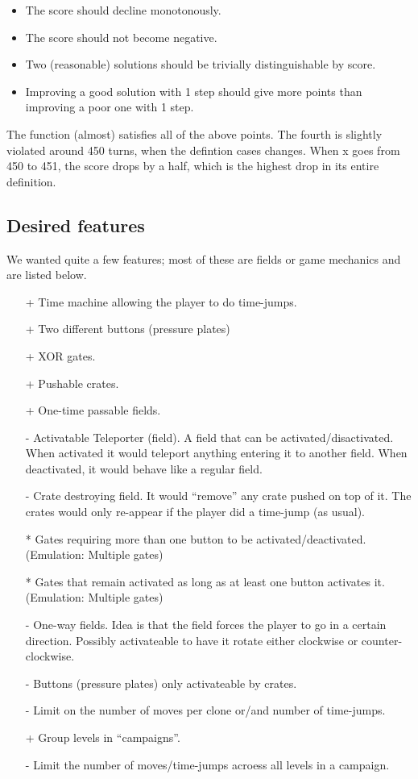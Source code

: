 \begin{itemize}
\item The score should decline monotonously.
\item The score should not become negative.
\item Two (reasonable) solutions should be trivially distinguishable by score.
\item Improving a good solution with 1 step should give more points
  than improving a poor one with 1 step.
\end{itemize}

The function (almost) satisfies all of the above points.  The fourth
is slightly violated around 450 turns, when the defintion cases
changes.  When x goes from 450 to 451, the score drops by a half,
which is the highest drop in its entire definition.

\subsection{Desired features}
We wanted quite a few features; most of these are fields or game
mechanics and are listed below.

\begin{itemize}
\item[+] Time machine allowing the player to do time-jumps.
\item[+] Two different buttons (pressure plates)
\item[+] XOR gates.
\item[+] Pushable crates.
\item[+] One-time passable fields.
\item[-] Activatable Teleporter (field).  A field that can be
  activated/disactivated.  When activated it would teleport anything
  entering it to another field.  When deactivated, it would behave
  like a regular field.
\item[-] Crate destroying field.  It would ``remove'' any crate pushed
  on top of it.  The crates would only re-appear if the player did a
  time-jump (as usual).
\item[*] Gates requiring more than one button to be activated/deactivated.
 (Emulation: Multiple gates)
\item[*] Gates that remain activated as long as at least one button activates
 it.  (Emulation: Multiple gates)
\item[-] One-way fields.  Idea is that the field forces the player to go
 in a certain direction.  Possibly activateable to have it rotate either
 clockwise or counter-clockwise.
\item[-] Buttons (pressure plates) only activateable by crates.
\item[-] Limit on the number of moves per clone or/and number of time-jumps.
\item[+] Group levels in ``campaigns''.
\item[-] Limit the number of moves/time-jumps acroess all levels in a campaign.
\end{itemize}

